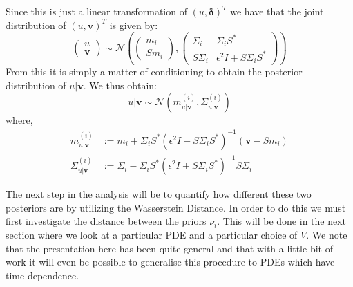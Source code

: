 Since this is just a linear transformation of $(u,\boldsymbol{\delta})^{T}$ we have that the joint distribution of $(u,\mathbf{v})^{T}$ is given by:
\begin{equation}
  \label{jointDist}
  \begin{pmatrix}
    u \\
    \mathbf{v}
  \end{pmatrix}\sim\mathcal{N}\left(
                              \begin{pmatrix}
                                m_{i} \\
                                Sm_{i}
                              \end{pmatrix},
                              \begin{pmatrix}
                                \Sigma_{i} & \Sigma_{i} S^{*} \\
                                S\Sigma_{i} & \epsilon^{2}I+S\Sigma_{i} S^{*}
                              \end{pmatrix}
                              \right)
\end{equation}
From this it is simply a matter of conditioning to obtain the posterior distribution of $u|\mathbf{v}$. We thus obtain:
\begin{equation}
  \label{posterior}
  u|\mathbf{v}\sim\mathcal{N}(m^{(i)}_{u|\mathbf{v}},\Sigma^{(i)}_{u|\mathbf{v}})
\end{equation}
where,
\begin{align}
  \label{posterior_mean}
  m^{(i)}_{u|\mathbf{v}}&:=m_i+\Sigma_{i}S^{*}(\epsilon^{2}I+S\Sigma_{i}S^{*})^{-1}(\mathbf{v}-Sm_{i}) \\
  \label{posterior_covariance}
  \Sigma^{(i)}_{u|\mathbf{v}}&:=\Sigma_{i}-\Sigma_{i}S^{*}(\epsilon^{2}I+S\Sigma_{i}S^{*})^{-1}S\Sigma_{i}
\end{align}

The next step in the analysis will be to quantify how different these two posteriors are by utilizing the Wasserstein Distance. In order to do this we must first investigate the distance between the priors $\nu_{i}$. This will be done in the next section where we look at a particular PDE and a particular choice of $V$. We note that the presentation here has been quite general and that with a little bit of work it will even be possible to generalise this procedure to PDEs which have time dependence.
